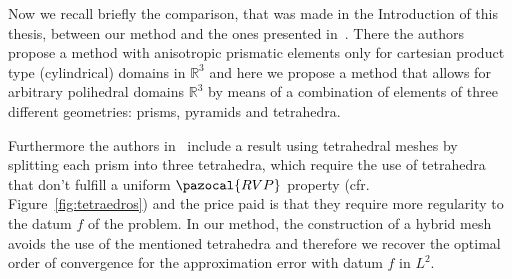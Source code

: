 Now we recall briefly the comparison, that was made in the
Introduction of this thesis, between our method and the
ones presented in~\cite{MR1866274}. There the authors propose
a method with anisotropic prismatic elements only for cartesian
product type (cylindrical) domains in $\mathbb{R}^3$ and 
here we propose
a method that allows for arbitrary polihedral domains $\mathbb{R}^3$ by
means of a combination of elements of three different geometries: prisms, pyramids
and tetrahedra.

Furthermore the authors in~\cite{MR1866274} include a result 
using tetrahedral meshes
by splitting each prism into three tetrahedra, which require
the use of tetrahedra
that don't fulfill a uniform $\pazocal{RVP}$ property 
(cfr. Figure~\ref{fig:tetraedros})
and the price paid is that they require more regularity 
to the datum $f$ of 
the problem.
In our method, the construction of a hybrid mesh avoids 
the use of the mentioned
tetrahedra and therefore we recover the optimal order of convergence for 
the approximation error with datum $f$ in $L^2$.






